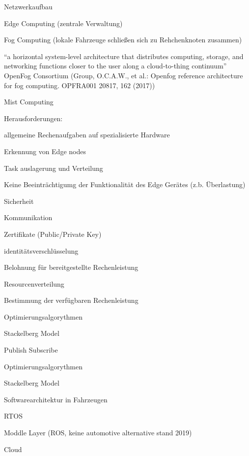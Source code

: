 \begin{notes}
    \item Netzwerkaufbau
    \begin{notes}
        \item Edge Computing (zentrale Verwaltung)
        \item Fog Computing (lokale Fahrzeuge schließen sich zu Rehchenknoten zusammen)
        \item “a horizontal system-level architecture that distributes computing, storage, and networking functions closer to the user along a cloud-to-thing continuum”  OpenFog Consortium (Group, O.C.A.W., et al.: Openfog reference architecture for fog computing. OPFRA001 20817, 162 (2017))
        \item Mist Computing
        \item Herausforderungen:
        \begin{notes}
            \item allgemeine Rechenaufgaben auf spezialisierte Hardware
            \item Erkennung von Edge nodes
            \item Task auslagerung und Verteilung
            \item Keine Beeinträchtigumg der Funktionalität des Edge Gerätes (z.b. Überlastung)
            \item Sicherheit
        \end{notes}
    \end{notes}
    \item Kommunikation
    \begin{notes}
        \item Zertifikate (Public/Private Key)
        \item identitätsverschlüsselung
        \item Belohnung für bereitgestellte Rechenleistung
    \end{notes}
    \item Resourcenverteilung
    \begin{notes}
        \item Bestimmung der verfügbaren Rechenleistung 
        \item Optimierungsalgorythmen
        \item Stackelberg Model
    \end{notes}
    \item Publish Subscribe
    \begin{notes}
        \item 
        \item Optimierungsalgorythmen
        \item Stackelberg Model
    \end{notes}
    \item Softwarearchitektur in Fahrzeugen
   \begin{notes}
        \item RTOS
        \item Moddle Layer (ROS, keine automotive alternative stand 2019)
        \item Cloud
    \end{notes}

\end{notes}

